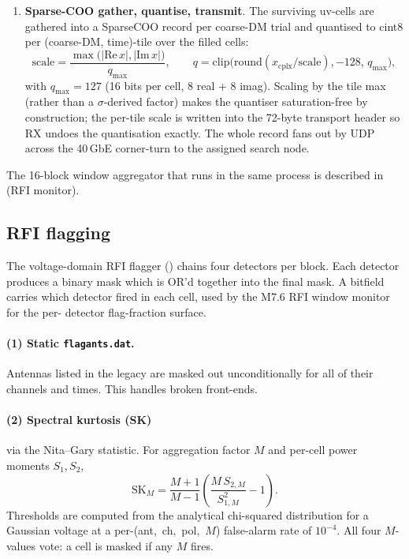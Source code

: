 \documentclass[11pt,a4paper]{article}
\newcommand{\codeword}[1]{\text{\ttfamily\small\detokenize{#1}}}
\begin{document}
\begin{enumerate}[topsep=2pt,itemsep=2pt]
\item \textbf{Sparse-COO gather, quantise, transmit}.  The
    surviving uv-cells are gathered into a SparseCOO record per
    coarse-DM trial and quantised to cint8 per (coarse-DM,
    time)-tile over the filled cells:
    \begin{equation}
       \mathrm{scale}
        = \frac{\max\bigl(|\mathrm{Re}\,x|, |\mathrm{Im}\,x|\bigr)}
               {q_\mathrm{max}},
       \qquad
       q = \mathrm{clip}\bigl(\mathrm{round}(x_\mathrm{cplx}/\mathrm{scale}),
                              -128,\, q_\mathrm{max}\bigr),
       \label{eq:requant}
    \end{equation}
    with $q_\mathrm{max}=127$ (16 bits per cell, 8 real + 8 imag).
    Scaling by the tile max (rather than a $\sigma$-derived factor)
    makes the quantiser saturation-free by construction; the
    per-tile scale is written into the 72-byte transport header so
    RX undoes the quantisation exactly.  The whole record fans out
    by UDP across the 40\,GbE corner-turn to the assigned search
    node.
\end{enumerate}

The 16-block window aggregator that runs in the same process is
described in~ (RFI monitor).


\subsection{RFI flagging}
\label{sec:rfi}

The voltage-domain RFI flagger
(\codeword{src/dsart/rfi/}) chains four detectors per block.  Each
detector produces a binary mask which is OR'd together into the
final mask.  A bitfield \codeword{source_tag} carries which detector
fired in each cell, used by the M7.6 RFI window monitor for the per-
detector flag-fraction surface.

\paragraph{(1) Static \texttt{flagants.dat}.}  Antennas listed in the
legacy \codeword{flagants.dat} are masked out unconditionally for all
of their channels and times.  This handles broken front-ends.

\paragraph{(2) Spectral kurtosis (SK)} via the Nita--Gary statistic.
For aggregation factor $M$ and per-cell power moments $S_1, S_2$,
\begin{equation}
   \mathrm{SK}_M = \frac{M+1}{M-1}
        \left(\frac{M\,S_{2,M}}{S_{1,M}^2} - 1\right).
   \label{eq:sk}
\end{equation}
Thresholds are computed from the analytical chi-squared distribution
for a Gaussian voltage at a per-(ant,~ch,~pol,~$M$) false-alarm
rate of $10^{-4}$.  All four $M$-values vote: a cell is masked if any
$M$ fires.
\end{document}
